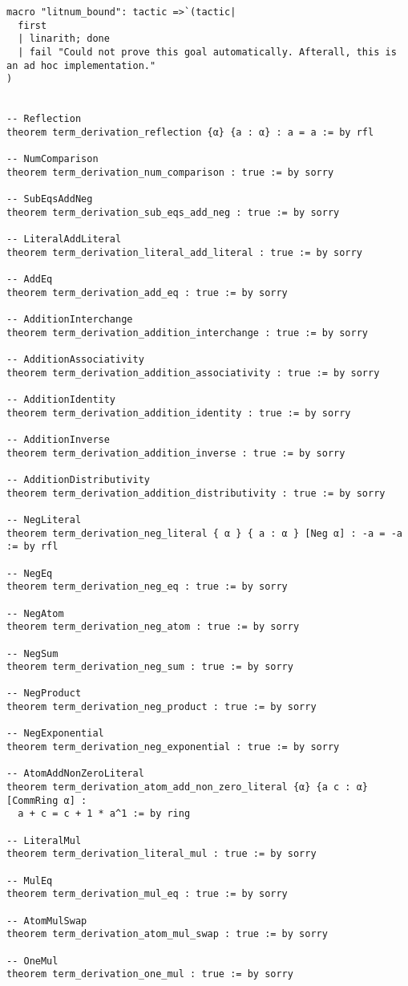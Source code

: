 \documentclass{article}
\begin{document}
\begin{tcolorbox}[colback=white!10, width=\linewidth]
\begin{lstlisting}[language=Lean4]
macro "litnum_bound": tactic =>`(tactic|
  first
  | linarith; done
  | fail "Could not prove this goal automatically. Afterall, this is an ad hoc implementation."
)


-- Reflection
theorem term_derivation_reflection {α} {a : α} : a = a := by rfl

-- NumComparison
theorem term_derivation_num_comparison : true := by sorry

-- SubEqsAddNeg
theorem term_derivation_sub_eqs_add_neg : true := by sorry

-- LiteralAddLiteral
theorem term_derivation_literal_add_literal : true := by sorry

-- AddEq
theorem term_derivation_add_eq : true := by sorry

-- AdditionInterchange
theorem term_derivation_addition_interchange : true := by sorry

-- AdditionAssociativity
theorem term_derivation_addition_associativity : true := by sorry

-- AdditionIdentity
theorem term_derivation_addition_identity : true := by sorry

-- AdditionInverse
theorem term_derivation_addition_inverse : true := by sorry

-- AdditionDistributivity
theorem term_derivation_addition_distributivity : true := by sorry

-- NegLiteral
theorem term_derivation_neg_literal { α } { a : α } [Neg α] : -a = -a := by rfl

-- NegEq
theorem term_derivation_neg_eq : true := by sorry

-- NegAtom
theorem term_derivation_neg_atom : true := by sorry

-- NegSum
theorem term_derivation_neg_sum : true := by sorry

-- NegProduct
theorem term_derivation_neg_product : true := by sorry

-- NegExponential
theorem term_derivation_neg_exponential : true := by sorry

-- AtomAddNonZeroLiteral
theorem term_derivation_atom_add_non_zero_literal {α} {a c : α} [CommRing α] : 
  a + c = c + 1 * a^1 := by ring

-- LiteralMul
theorem term_derivation_literal_mul : true := by sorry

-- MulEq
theorem term_derivation_mul_eq : true := by sorry

-- AtomMulSwap
theorem term_derivation_atom_mul_swap : true := by sorry

-- OneMul
theorem term_derivation_one_mul : true := by sorry


\end{lstlisting}
\end{tcolorbox}
\end{document}
